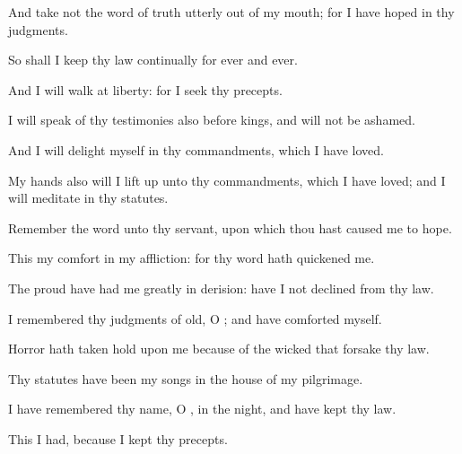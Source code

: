 {\Q {}And
take not the
word of
truth
utterly out of my
mouth; for I have
hoped in thy
judgments.


\par }{\Q {}So shall I
keep thy
law
continually for
ever and
ever.


\par }{\BB \par }
{\Q {}And I will
walk at
liberty: for I
seek thy
precepts.


\par }{\Q {}I will
speak of thy
testimonies also before
kings, and will not be
ashamed.


\par }{\Q {}And I will
delight myself in thy
commandments, which I have
loved.


\par }{\Q {}My
hands also will I lift
up unto thy
commandments, which I have
loved; and I will
meditate in thy
statutes.


\par }{
\par }
{\Q {}Remember the
word unto thy
servant, upon which thou hast caused me to
hope.


\par }{\Q {}This
{} my
comfort in my
affliction: for thy
word hath
quickened me.


\par }{\Q {}The
proud have had me
greatly in
derision:
{} have I not
declined from thy
law.


\par }{\Q {}I
remembered thy
judgments of
old, O
{}; and have
comforted myself.


\par }{\Q {}Horror hath taken
hold upon me because of the
wicked that
forsake thy
law.


\par }{\Q {}Thy
statutes have been my
songs in the
house of my
pilgrimage.


\par }{\BB \par }
{\Q {}I have
remembered thy
name, O
{}, in the
night, and have
kept thy
law.


\par }{\Q {}This I had, because I
kept thy
precepts.


\par }{
\par }
